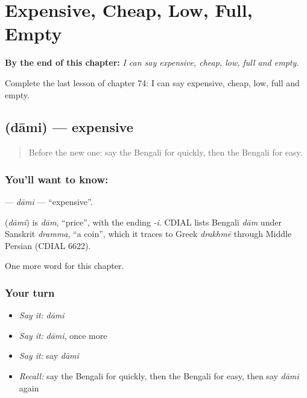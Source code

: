 
\chapter{Expensive, Cheap, Low, Full, Empty}
\label{ch:bn-expensive-cheap-low-full-empty}

\begin{chapteropening}
\textbf{By the end of this chapter:} \emph{I can say expensive, cheap, low, full and empty.}

Complete the last lesson of chapter 74: I can say expensive, cheap, low, full and empty.
\end{chapteropening}

\section[\texorpdfstring{\bn{দামি} (dāmi)}{দামি (dāmi)}]{ (dāmi) — expensive}

\label{lesson:BN-C74-dami}



\begin{quote}
Before the new one: say the Bengali for quickly, then the Bengali for easy.
\end{quote}

\subsection*{You'll want to know: }
\textbf{} — \emph{dāmi} — \textquotedblleft{}expensive\textquotedblright{}.

\begin{cousinweb}
\textbf{} (\emph{dāmi}) is \emph{dām}, \textquotedblleft{}price\textquotedblright{}, with the ending \emph{-i}. CDIAL lists Bengali \emph{dām} under Sanskrit \emph{dramma}, \textquotedblleft{}a coin\textquotedblright{}, which it traces to Greek \emph{drakhmē} through Middle Persian (CDIAL 6622).
\end{cousinweb}

\begin{grammarlens}[title={What you've built}]
One more word for this chapter.
\end{grammarlens}

\subsection*{Your turn}
\begin{itemize}
\raggedright
  \item \emph{Say it:} \emph{dāmi}
  \item \emph{Say it:} \emph{dāmi}, once more
  \item \emph{Say it:} say \emph{dāmi}
  \item \emph{Recall:} say the Bengali for quickly, then the Bengali for easy, then say \emph{dāmi} again
\end{itemize}

